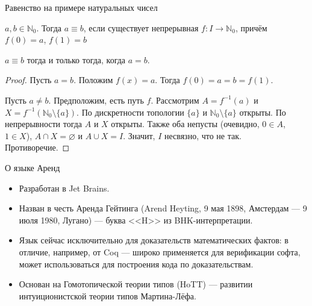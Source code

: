 \documentclass[aspectratio=169]{beamer}
\begin{document}
\begin{frame}{Равенство на примере натуральных чисел}
\begin{dfn}$a,b \in \mathbb{N}_0$. Тогда $a\equiv b$, если существует непрерывная $f: I\rightarrow\mathbb{N}_0$, причём $f(0)=a$, $f(1)=b$\end{dfn}
\begin{lmm}$a\equiv b$ тогда и только тогда, когда $a=b$.\end{lmm}
\begin{proof}Пусть $a = b$. Положим $f(x) = a$. Тогда $f(0)=a=b=f(1)$.

Пусть $a \ne b$. Предположим, есть путь $f$. Рассмотрим $A=f^{-1}(a)$ и $X=f^{-1}(\mathbb{N}_0\setminus\{a\})$. 
По дискретности топологии $\{a\}$ и $\mathbb{N}_0\setminus\{a\}$ открыты. По непрерывности тогда $A$ и $X$ открыты.
Также оба непусты (очевидно, $0 \in A$, $1 \in X$), $A \cap X = \varnothing$ и $A \cup X = I$. Значит, $I$ несвязно, что не так.
Противоречие.
\end{proof}
\end{frame}

\begin{frame}{О языке Аренд}
\begin{itemize}
\item Разработан в Jet Brains.
\item Назван в честь Аренда Гейтинга (Arend Heyting, 9 мая 1898, Амстердам — 9 июля 1980, Лугано) --- буква <<H>> из BHK-интерпретации.
\item Язык сейчас исключительно для доказательств математических фактов: в отличие, например, от Coq ---
широко применяется для верификации софта, может использоваться для построения кода по доказательствам.
\item Основан на Гомотопической теории типов (HoTT) --- развитии интуиционистской теории типов Мартина-Лёфа.
\end{itemize}
\end{frame}
\end{document}
